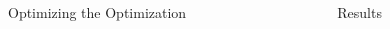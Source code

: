 \documentclass[final]{beamer}
\begin{document}
\begin{frame}{}
{\begin{columns}[t]
\begin{column}{.30\linewidth}
\begin{block}{\centering Optimizing the Optimization}
	\vspace{0.8cm}

\end{block}

   

                

 \end{column}
        
\begin{column}{.30\linewidth}



                
\begin{block}{\centering Results}


\end{block}
\end{column}
\end{columns}}
\end{frame}
\end{document}
